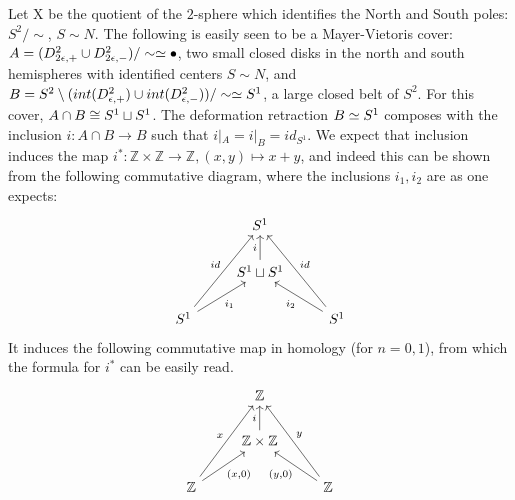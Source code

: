 \begin{example}
Let X be the quotient of the $2$-sphere which identifies the North and South poles: $S^2/\sim$, $S \sim N$. The following is easily seen to be a Mayer-Vietoris cover: $A=(D^2_{2\epsilon,+}\cup D^2_{2\epsilon,-})/\sim\simeq \bullet$, two small closed disks in the north and south hemispheres with identified centers $S\sim N$, and $B=S^2\setminus(int(D^2_{\epsilon,+}) \cup int(D^2_{\epsilon,-}))/\sim \simeq S^1$, a large closed belt of $S^2$. For this cover, $A\cap B \cong S^1\sqcup S^1$. The deformation retraction $B\simeq S^1$ composes with the inclusion $i:A\cap B\rightarrow B$ such that $i|_A=i|_B =id_{S^1}$. We expect that inclusion induces the map $i^*:\mathbb{Z}\times \mathbb{Z}\rightarrow \mathbb{Z}, (x,y)\mapsto x+y$, and indeed this can be shown from the following commutative diagram, where the inclusions $i_1,i_2$ are as one expects:
\[\begin{tikzcd}
                                         & S^1                           &                                          \\
                                         & S^1 \sqcup S^1 \arrow[u, "i"] &                                          \\
S^1 \arrow[ru, "i_1"'] \arrow[ruu, "id"] &                               & S^1 \arrow[lu, "i_2"] \arrow[luu, "id"']
\end{tikzcd}\]
It induces the following commutative map in homology (for $n=0,1$), from which the formula for $i^*$ can be easily read. 
\[\begin{tikzcd}
                                                   & \mathbb{Z}                                 &                                                    \\
                                                   & \mathbb{Z}\times \mathbb{Z} \arrow[u, "i"] &                                                    \\
\mathbb{Z} \arrow[ru, "{(x,0)}"'] \arrow[ruu, "x"] &                                            & \mathbb{Z} \arrow[lu, "{(y,0)}"] \arrow[luu, "y"']
\end{tikzcd}\]


\end{example}
